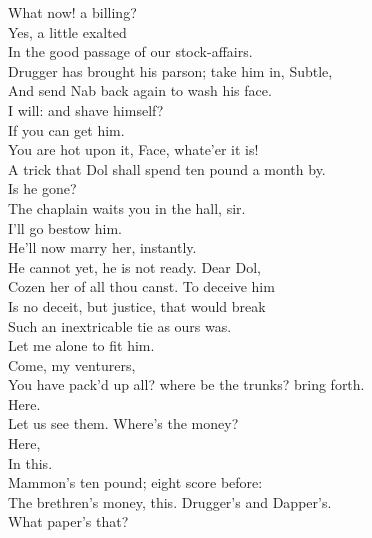 \documentclass[a4paper,oneside]{memoir}
\begin{document}
\begin{drama*}
\facespeaks What now! a billing?\\
\subtlespeaks {} Yes, a little exalted\\
In the good passage of our stock-affairs.\\
\facespeaks Drugger has brought his parson; take him in, Subtle,\\
And send Nab back again to wash his face.\\
\subtlespeaks I will: and shave himself?\\
\facespeaks {} If you can get him.\\
\dolspeaks You are hot upon it, Face, whate'er it is!\\
\facespeaks A trick that Dol shall spend ten pound a month by.\\
Is he gone?\\
\subtlespeaks {} The chaplain waits you in the hall, sir.\\
\facespeaks I'll go bestow him.\\
\dolspeaks {} He'll now marry her, instantly.\\
\subtlespeaks He cannot yet, he is not ready. Dear Dol,\\
Cozen her of all thou canst. To deceive him\\
Is no deceit, but justice, that would break\\
Such an inextricable tie as ours was.\\
\dolspeaks Let me alone to fit him.\\
\facespeaks {} Come, my venturers,\\
You have pack'd up all? where be the trunks? bring forth.\\
\subtlespeaks Here.\\
\facespeaks {} Let us see them. Where's the money?\\
\subtlespeaks {} Here,\\
In this.\\
\facespeaks {} Mammon's ten pound; eight score before:\\
The brethren's money, this. Drugger's and Dapper's.\\
What paper's that?\\

\end{drama*}
\end{document}
